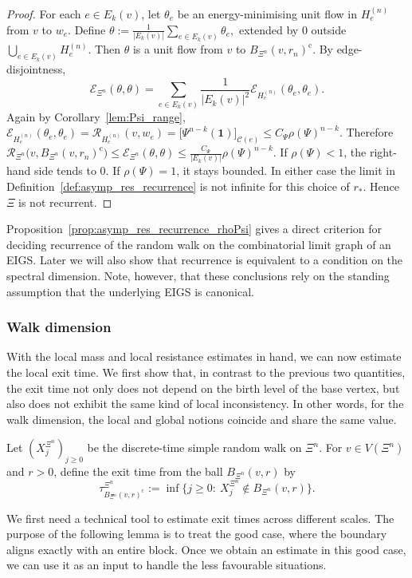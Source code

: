 \documentclass{article}
\theoremstyle{plain}
\theoremstyle{definition}
\newcommand{\Reff}{\mathscr{R}}
\begin{document}
\begin{proof}
For each $e\in E_k(v)$, let $\theta_e$ be an energy-minimising unit flow in $H_e^{(n)}$ from $v$ to $w_e$.
Define
$
\theta:=\frac{1}{|E_k(v)|}\sum_{e\in E_k(v)} \theta_e,
$
extended by $0$ outside $\bigcup_{e\in E_k(v)} H_e^{(n)}$.
Then $\theta$ is a unit flow from $v$ to $B_{\Xi^n}(v,r_n)^{\mathrm c}$.
By edge-disjointness,
\[
\mathcal E_{\Xi^n}(\theta,\theta)
=
\sum_{e\in E_k(v)}
\frac{1}{|E_k(v)|^2}\mathcal E_{H_e^{(n)}}(\theta_e,\theta_e).
\]
Again by Corollary~\ref{lem:Psi_range},
$
\mathcal E_{H_e^{(n)}}(\theta_e,\theta_e)
=
\Reff_{H_e^{(n)}}(v,w_e)
=
\big[\Psi^{n-k}(\mathbf 1)\big]_{\mathscr C(e)}
\le
C_{\Psi}\rho(\Psi)^{n-k}.
$
Therefore
$
\Reff_{\Xi^n}\bigl(v,B_{\Xi^n}(v,r_n)^{\mathrm c}\bigr)
\le
\mathcal E_{\Xi^n}(\theta,\theta)
\le
\frac{C_{\Psi}}{|E_k(v)|}\rho(\Psi)^{n-k}.
$
If $\rho(\Psi)<1$, the right-hand side tends to $0$.
If $\rho(\Psi)=1$, it stays bounded.
In either case the limit in Definition~\ref{def:asymp_res_recurrence} is not infinite for this choice of $r_*$.
Hence $\Xi$ is not recurrent.
\end{proof}

Proposition~\ref{prop:asymp_res_recurrence_rhoPsi} gives a direct criterion for deciding recurrence of the random walk on the combinatorial limit graph of an EIGS.
Later we will also show that recurrence is equivalent to a condition on the spectral dimension.
Note, however, that these conclusions rely on the standing assumption that the underlying EIGS is canonical.

\subsubsection*{Walk dimension}

With the local mass and local resistance estimates in hand, we can now estimate the local exit time.
We first show that, in contrast to the previous two quantities, the exit time not only does not depend on the birth level of the base vertex, but also does not exhibit the same kind of local inconsistency.
In other words, for the walk dimension, the local and global notions coincide and share the same value.

Let $(X_j^{\Xi^n})_{j\ge 0}$ be the discrete-time simple random walk on $\Xi^n$.
For $v\in V(\Xi^n)$ and $r>0$, define the exit time from the ball $B_{\Xi^n}(v,r)$ by
\[
\tau_{B_{\Xi^n}(v,r)^{\mathrm c}}^{\Xi^n}
:=
\inf\{j\ge 0:\ X_j^{\Xi^n}\notin B_{\Xi^n}(v,r)\}.
\]

We first need a technical tool to estimate exit times across different scales.
The purpose of the following lemma is to treat the good case, where the boundary aligns exactly with an entire block.
Once we obtain an estimate in this good case, we can use it as an input to handle the less favourable situations.
\end{document}

